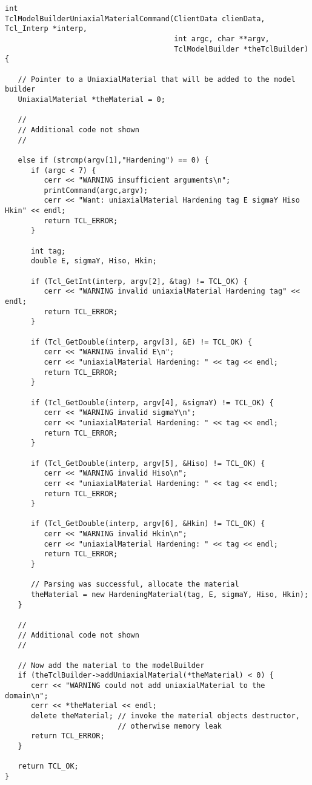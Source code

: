 \documentclass[12pt]{article}
\begin{document}
{\sf\small
\begin{verbatim}
int
TclModelBuilderUniaxialMaterialCommand(ClientData clienData, Tcl_Interp *interp,
                                       int argc, char **argv,
                                       TclModelBuilder *theTclBuilder)
{

   // Pointer to a UniaxialMaterial that will be added to the model builder
   UniaxialMaterial *theMaterial = 0;

   //
   // Additional code not shown
   //

   else if (strcmp(argv[1],"Hardening") == 0) {
      if (argc < 7) {
         cerr << "WARNING insufficient arguments\n";
         printCommand(argc,argv);
         cerr << "Want: uniaxialMaterial Hardening tag E sigmaY Hiso Hkin" << endl;
         return TCL_ERROR;
      }

      int tag;
      double E, sigmaY, Hiso, Hkin;

      if (Tcl_GetInt(interp, argv[2], &tag) != TCL_OK) {
         cerr << "WARNING invalid uniaxialMaterial Hardening tag" << endl;
         return TCL_ERROR;		
      }

      if (Tcl_GetDouble(interp, argv[3], &E) != TCL_OK) {
         cerr << "WARNING invalid E\n";
         cerr << "uniaxialMaterial Hardening: " << tag << endl;
         return TCL_ERROR;	
      }

      if (Tcl_GetDouble(interp, argv[4], &sigmaY) != TCL_OK) {
         cerr << "WARNING invalid sigmaY\n";
         cerr << "uniaxialMaterial Hardening: " << tag << endl;
         return TCL_ERROR;
      }

      if (Tcl_GetDouble(interp, argv[5], &Hiso) != TCL_OK) {
         cerr << "WARNING invalid Hiso\n";
         cerr << "uniaxialMaterial Hardening: " << tag << endl;
         return TCL_ERROR;	
      }

      if (Tcl_GetDouble(interp, argv[6], &Hkin) != TCL_OK) {
         cerr << "WARNING invalid Hkin\n";
         cerr << "uniaxialMaterial Hardening: " << tag << endl;
         return TCL_ERROR;	
      }

      // Parsing was successful, allocate the material
      theMaterial = new HardeningMaterial(tag, E, sigmaY, Hiso, Hkin);       
   }

   //
   // Additional code not shown
   //

   // Now add the material to the modelBuilder
   if (theTclBuilder->addUniaxialMaterial(*theMaterial) < 0) {
      cerr << "WARNING could not add uniaxialMaterial to the domain\n";
      cerr << *theMaterial << endl;
      delete theMaterial; // invoke the material objects destructor,
                          // otherwise memory leak
      return TCL_ERROR;
   }

   return TCL_OK;
}
\end{verbatim}
}
\end{document}
